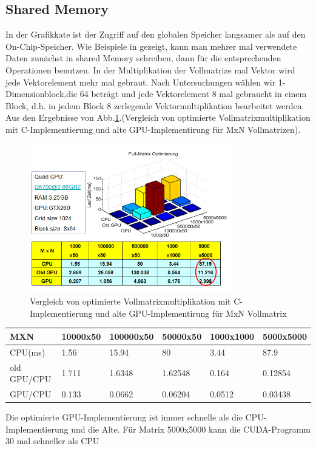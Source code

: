 \subsection{Shared Memory}
In der Grafikkate ist der Zugriff auf den globalen Speicher langsamer als auf den On-Chip-Speicher.  Wie Beispiele in \cite{cudapg} gezeigt, kann man mehrer mal verwendete Daten zunächst in shared Memory schreiben, dann für die entsprechenden Operationen benutzen. In der Multiplikation der Vollmatrize mal Vektor wird jede Vektorelement mehr mal gebraut. Nach Untersuchungen wählen wir 1-Dimensionblock,die 64 beträgt und jede Vektorelement 8 mal gebraucht in einem Block, d.h. in jedem Block 8 zerlegende Vektormultiplikation bearbeitet werden. Aus den Ergebnisse von Abb.\ref{sharememory}.(Vergleich von optimierte Vollmatrixmultiplikation mit C-Implementierung und alte GPU-Implementirung für MxN Vollmatrizen).
\begin{figure}[htbp]
\includegraphics[width=3.5in]{../xby/pic/sharememory}
\caption{Vergleich von optimierte Vollmatrixmultiplikation mit C-Implementierung und alte GPU-Implementirung für MxN Vollmatrix}
\label{sharememory}
\end{figure}


\begin{table}
\centering
\begin{tabular}{|p{46pt}p{28pt}p{30pt}p{28pt}p{30pt}p{30pt}|}
\toprule
	MXN& 10000x50& 100000x50& 50000x50& 1000x1000& 5000x5000\\

\midrule
CPU(ms)& 1.56&    15.94& 				80&      3.44& 87.9\\

old GPU/CPU& 1.711& 1.6348&   1.62548&  0.164&  0.12854\\

GPU/CPU & 0.133& 0.0662&     0.06204&   0.0512& 0.03438\\
\bottomrule
\end{tabular}
\end{table}

Die optimierte GPU-Implementierung ist immer schnelle als die CPU-Implementierung  und die Alte. Für Matrix 5000x5000 kann die CUDA-Programm 30 mal schneller als CPU

